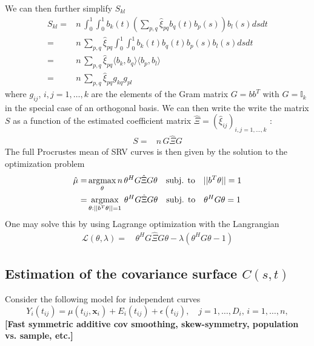 We can then further simplify $S_{kl}$
\begin{align*}
    S_{kl} =& n \, \int_0^1 \int_0^1 b_k(t) \left( \sum_{p,q} \hat{\xi}_{pq} b_q(t) b_p(s) \right) b_l(s) ds dt\\
    =& n \, \sum_{p,q} \hat{\xi}_{pq} \int_0^1 \int_0^1 b_k(t) b_q(t) b_p(s) b_l(s) ds dt\\
    =& n \, \sum_{p,q} \hat{\xi}_{pq} \langle b_k, b_q \rangle \langle b_p, b_l \rangle\\
    =& n \, \sum_{p,q} \hat{\xi}_{pq} g_{kq} g_{pl}
\end{align*}
where $g_{ij}$, $i,j = 1, \dots, k$ are the elements of the Gram matrix $G = bb^T$ with $G = \mathbb{I}_k$ in the special case of an orthogonal basis.
We can then write the write the matrix $S$ as a function of the estimated coefficient matrix $\hat{\Xi} = (\hat{\xi}_{ij})_{i,j = 1, \dots, k}$ :
\begin{align*}
    S =& n \, G \hat{\Xi} G
\end{align*}
The full Procrustes mean of SRV curves is then given by the solution to the optimization problem
\begin{align*}
    \hat{\mu} =& \operatorname*{argmax}_{\theta} n \, \theta^H G \hat{\Xi} G \theta \quad \text{subj. to} \quad ||b^T \theta|| = 1 \\
    =& \operatorname*{argmax}_{\theta : ||b^T\theta||=1} \, \theta^H G \hat{\Xi} G \theta \quad \text{subj. to} \quad \theta^H G \theta = 1
\end{align*}
One may solve this by using Lagrange optimization with the Langrangian
\begin{align*}
  \mathcal{L}(\theta,\lambda) =& \, \theta^H G \hat{\Xi} G \theta - \lambda ( \theta^H G \theta - 1)
\end{align*}


\newpage
\subsection{Estimation of the covariance surface $C(s,t)$}
Consider the following model for independent curves
\begin{equation}
    Y_i(t_{ij}) = \mu(t_{ij}, \mathbf{x}_i) + E_i(t_{ij}) + \epsilon(t_{ij}),
    \quad j = 1,\dots,D_i, \, i = 1,\dots,n,
\end{equation}
\textbf{[Fast symmetric additive cov smoothing, skew-symmetry, population vs. sample, etc.]}


